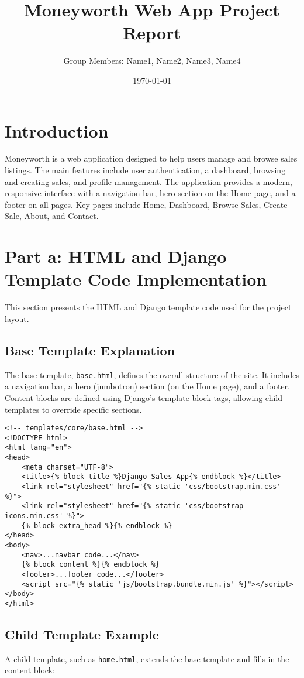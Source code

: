 \documentclass[12pt]{article}
\title{Moneyworth Web App Project Report}
\author{Group Members: Name1, Name2, Name3, Name4}
\date{\today}
\begin{document}
\maketitle

\section{Introduction}
Moneyworth is a web application designed to help users manage and browse sales listings.
The main features include user authentication, a dashboard, browsing and creating sales, 
and profile management. The application provides a modern, 
responsive interface with a navigation bar, 
hero section on the Home page, and a footer on all pages.
Key pages include Home, Dashboard, Browse Sales, Create Sale, About, and Contact.

\section{Part a: HTML and Django Template Code Implementation}
This section presents the HTML and Django template code used for the project layout.

\subsection{Base Template Explanation}
The base template, \texttt{base.html}, defines the overall structure of the site. 
It includes a navigation bar, a hero (jumbotron) section (on the Home page), and a footer. 
Content blocks are defined using Django's template block tags, allowing child templates to 
override specific sections.

\begin{verbatim}
<!-- templates/core/base.html -->
<!DOCTYPE html>
<html lang="en">
<head>
    <meta charset="UTF-8">
    <title>{% block title %}Django Sales App{% endblock %}</title>
    <link rel="stylesheet" href="{% static 'css/bootstrap.min.css' %}">
    <link rel="stylesheet" href="{% static 'css/bootstrap-icons.min.css' %}">
    {% block extra_head %}{% endblock %}
</head>
<body>
    <nav>...navbar code...</nav>
    {% block content %}{% endblock %}
    <footer>...footer code...</footer>
    <script src="{% static 'js/bootstrap.bundle.min.js' %}"></script>
</body>
</html>
\end{verbatim}

\subsection{Child Template Example}
A child template, such as \texttt{home.html}, extends the base template and fills in the 
content block:
\end{document}
